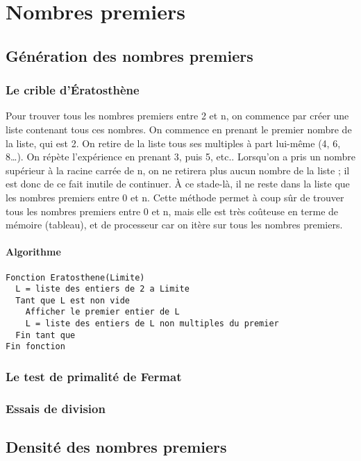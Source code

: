 \chapter{Nombres premiers}
	\section{Génération des nombres premiers}
		\subsection{Le crible d'Ératosthène}
			Pour trouver tous les nombres premiers entre 2 et n, on commence par créer une liste contenant tous ces nombres.
			On commence en prenant le premier nombre de la liste, qui est 2. On retire de la liste tous ses multiples à part lui-même (4, 6, 8…). On répète l’expérience en prenant 3, puis 5, etc..
			Lorsqu’on a pris un nombre supérieur à la racine carrée de n, on ne retirera plus aucun nombre de la liste ; il est donc de ce fait inutile de continuer.
			À ce stade-là, il ne reste dans la liste que les nombres premiers entre 0 et n. Cette méthode permet à coup sûr de trouver tous les nombres premiers entre 0 et n, mais elle est très coûteuse en terme de mémoire (tableau), et de processeur car on itère sur tous les nombres premiers.
			\subsubsection{Algorithme}
				\begin{lstlisting}
Fonction Eratosthene(Limite)
  L = liste des entiers de 2 a Limite
  Tant que L est non vide
    Afficher le premier entier de L
    L = liste des entiers de L non multiples du premier
  Fin tant que
Fin fonction
				\end{lstlisting}
		\subsection{Le test de primalité de Fermat}
			
		\subsection{Essais de division}
	\section{Densité des nombres premiers}